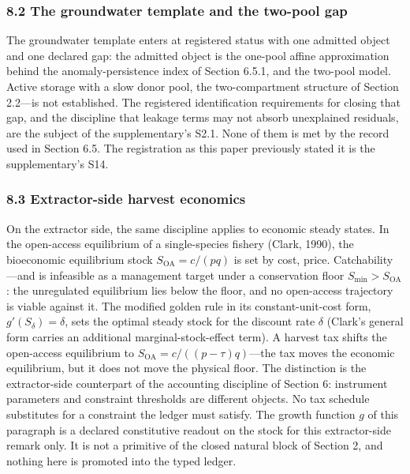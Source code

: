 \documentclass[11pt]{article}
\begin{document}
\subsubsection{8.2 The groundwater template and the two-pool
gap}\label{the-groundwater-template-and-the-two-pool-gap}

The groundwater template enters at registered status with one admitted object and one declared gap: the admitted object is the one-pool affine approximation behind the anomaly-persistence index of Section 6.5.1, and the two-pool model. Active storage with a slow donor pool, the two-compartment structure of Section 2.2---is not established. The registered identification requirements for closing that gap, and the discipline that leakage terms may not absorb unexplained residuals, are the subject of the supplementary's S2.1. None of them is met by the record used in Section 6.5. The registration as this paper previously stated it is the supplementary's S14.

\subsubsection{8.3 Extractor-side harvest
economics}\label{extractor-side-harvest-economics}

On the extractor side, the same discipline applies to economic steady states. In the open-access equilibrium of a single-species fishery (Clark, 1990), the bioeconomic equilibrium stock \(S_{\mathrm{OA}} = c/(pq)\) is set by cost, price. Catchability---and is infeasible as a management target under a conservation floor \(S_{\min} > S_{\mathrm{OA}}\): the unregulated equilibrium lies below the floor, and no open-access trajectory is viable against it. The modified golden rule in its constant-unit-cost form, \(g'(S_\delta) = \delta\), sets the optimal steady stock for the discount rate \(\delta\) (Clark's general form carries an additional marginal-stock-effect term). A harvest tax shifts the open-access equilibrium to \(S_{\mathrm{OA}} = c/((p - \tau)q)\)---the tax moves the economic equilibrium, but it does not move the physical floor. The distinction is the extractor-side counterpart of the accounting discipline of Section 6: instrument parameters and constraint thresholds are different objects. No tax schedule substitutes for a constraint the ledger must satisfy. The growth function \(g\) of this paragraph is a declared constitutive readout on the stock for this extractor-side remark only. It is not a primitive of the closed natural block of Section 2, and nothing here is promoted into the typed ledger.
\end{document}
